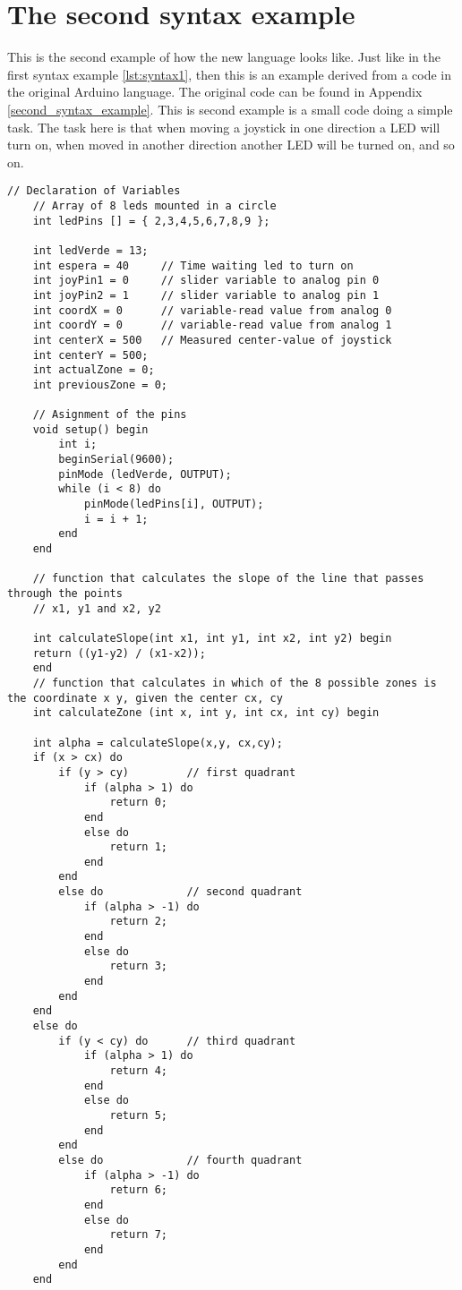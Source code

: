 \section{The second syntax example}
This is the second example of how the new language looks like. Just like in the first syntax example \ref{lst:syntax1}, then this is an example derived from a code in the original Arduino language. The original code can be found in Appendix \ref{second_syntax_example}. This is second example is a small code doing a simple task. The task here is that when moving a joystick in one direction a LED will turn on, when moved in another direction another LED will be turned on, and so on. 
\begin{lstlisting}[caption=Joystick code example based on the source language, label=lst:syntax2]
    // Declaration of Variables
    // Array of 8 leds mounted in a circle
    int ledPins [] = { 2,3,4,5,6,7,8,9 };    
    
    int ledVerde = 13;
    int espera = 40		// Time waiting led to turn on
    int joyPin1 = 0		// slider variable to analog pin 0
    int joyPin2 = 1		// slider variable to analog pin 1
    int coordX = 0		// variable-read value from analog 0
    int coordY = 0		// variable-read value from analog 1
    int centerX = 500	// Measured center-value of joystick
    int centerY = 500;
    int actualZone = 0;
    int previousZone = 0;
    
    // Asignment of the pins
    void setup() begin
        int i;
        beginSerial(9600);
        pinMode (ledVerde, OUTPUT);
        while (i < 8) do
            pinMode(ledPins[i], OUTPUT);
            i = i + 1;
        end
    end

    // function that calculates the slope of the line that passes through the points
    // x1, y1 and x2, y2

    int calculateSlope(int x1, int y1, int x2, int y2) begin
    return ((y1-y2) / (x1-x2));
    end
    // function that calculates in which of the 8 possible zones is the coordinate x y, given the center cx, cy
    int calculateZone (int x, int y, int cx, int cy) begin
  
    int alpha = calculateSlope(x,y, cx,cy);     
    if (x > cx) do
        if (y > cy) 		// first quadrant 
            if (alpha > 1) do                   
                return 0;
            end
            else do
                return 1;                      
            end
        end
        else do				// second quadrant
            if (alpha > -1) do
                return 2;
            end
            else do
                return 3;
            end
        end
    end
    else do
        if (y < cy) do		// third quadrant
            if (alpha > 1) do
                return 4;
            end
            else do
                return 5;
            end
        end
        else do				// fourth quadrant
            if (alpha > -1) do
                return 6;
            end
            else do
                return 7;
            end
        end
    end
    

\end{lstlisting}

